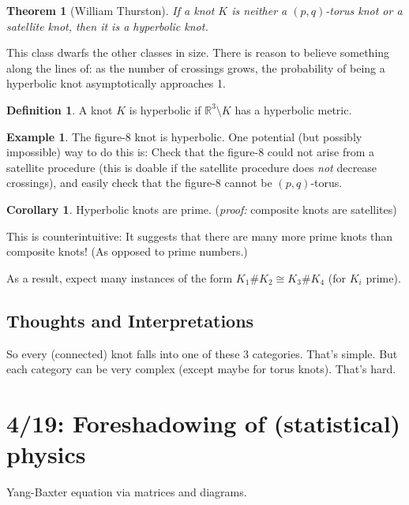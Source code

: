 \documentclass[11pt]{article}
\newcommand{\R}{\mathbb{R}}
\theoremstyle{plain}
\newtheorem{thm}{Theorem}
\theoremstyle{definition}
\newtheorem{definition}{Definition}
\newtheorem{cor}{Corollary}
\newtheorem{ex}{Example}
\begin{document}
\begin{thm}[William Thurston]
  If a knot $K$ is neither a $(p,q)$-torus knot or a satellite knot, then it is a hyperbolic knot.
\end{thm}

This class dwarfs the other classes in size. There is reason to believe something along the lines of: as the number of crossings grows, the probability of being a hyperbolic knot asymptotically approaches 1.

\begin{definition}
  A knot $K$ is hyperbolic if $\R^3 \setminus K$ has a hyperbolic metric.
\end{definition}


\begin{ex}
The figure-8 knot is hyperbolic. One potential (but possibly impossible) way to do this is: Check that the figure-8 could not arise from a satellite procedure (this is doable if the satellite procedure does \textit{not} decrease crossings), and easily check that the figure-8 cannot be $(p,q)$-torus.
\end{ex}


\begin{cor}
  Hyperbolic knots are prime. (\textit{proof:} composite knots are satellites)
\end{cor}

This is counterintuitive: It suggests that there are many more prime knots than composite knots! (As opposed to prime numbers.) 

As a result, expect many instances of the form $K_1\# K_2\cong K_3\# K_4$ (for $K_i$ prime).


\subsection{Thoughts and Interpretations}

So every (connected) knot falls into one of these 3 categories. That's simple. But each category can be very complex (except maybe for torus knots). That's hard.


\clearpage
\section{4/19: Foreshadowing of (statistical) physics}

Yang-Baxter equation via matrices and diagrams.
\end{document}
